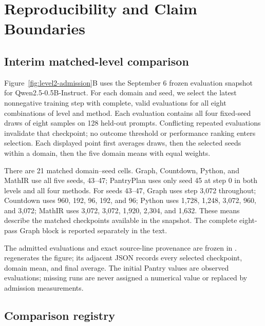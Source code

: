 \documentclass{article}
\newcommand{\1}{\mathbf 1}
\theoremstyle{remark}
\theoremstyle{definition}
\theoremstyle{plain}
\begin{document}
\section{Reproducibility and Claim Boundaries}
\label{app:reproducibility}

\subsection{Interim matched-level comparison}
\label{app:level2-interim}

Figure~\ref{fig:level2-admission}B uses the September 6 frozen evaluation
snapshot for Qwen2.5-0.5B-Instruct. For each domain and seed, we select the
latest nonnegative training step with complete, valid evaluations for all
eight combinations of level and method. Each evaluation contains all four
fixed-seed draws of eight samples on 128 held-out prompts. Conflicting
repeated evaluations invalidate that checkpoint; no outcome threshold or
performance ranking enters selection. Each displayed point first averages
draws, then the selected seeds within a domain, then the five domain means
with equal weights.

There are 21 matched domain--seed cells. Graph, Countdown, Python, and MathIR
use all five seeds, 43--47; PantryPlan uses only seed 45 at step 0 in both
levels and all four methods. For seeds 43--47, Graph uses step 3,072 throughout;
Countdown uses 960, 192, 96, 192, and 96; Python uses 1,728, 1,248, 3,072,
960, and 3,072; MathIR uses 3,072, 3,072, 1,920, 2,304, and 1,632.
These means describe the matched checkpoints available in the snapshot.
The complete eight-pass Graph block is reported separately in the text.

The admitted evaluations and exact source-line provenance are frozen in
.
 regenerates the figure;
its adjacent JSON records every selected checkpoint, domain mean, and final
average. The initial Pantry values are observed evaluations; missing runs
are never assigned a numerical value or replaced by admission measurements.

\subsection{Comparison registry}
\label{app:program-registry}
\end{document}
